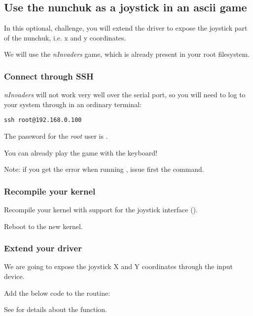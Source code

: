 \subsection{Use the nunchuk as a joystick in an ascii game}

In this optional, challenge, you will extend the driver to expose
the joystick part of the nunchuk, i.e. x and y coordinates.

We will use the {\em nInvaders} game, which is already present in
your root filesystem.

\subsubsection{Connect through SSH}

{\em nInvaders} will not work very well over the serial port,
so you will need to log to your system through  in an
ordinary terminal:

\begin{verbatim}
ssh root@192.168.0.100
\end{verbatim}

The password for the {\em root} user is .

You can already play the  game with
the keyboard!

Note: if you get the error 
when running , issue first the
 command.

\subsubsection{Recompile your kernel}

Recompile your kernel with support for the joystick interface
().

Reboot to the new kernel.

\subsubsection{Extend your driver}

We are going to expose the joystick X and Y coordinates through
the input device.

Add the below code to the  routine:

See  for details about
the  function.

